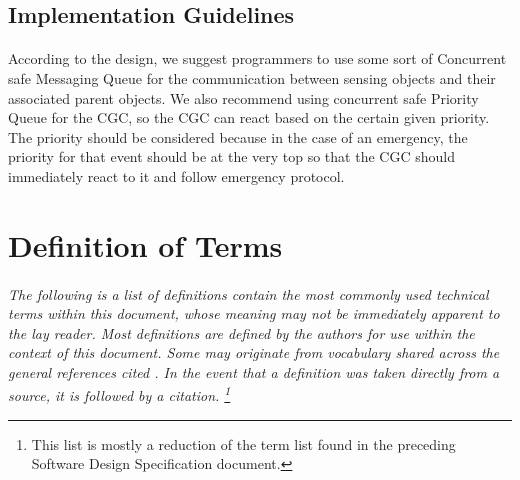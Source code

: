 \documentclass[12pt]{article}
\begin{document}
    \subsection{Implementation Guidelines}
    \paragraph{} According to the design, we suggest programmers to use some sort of 
    Concurrent safe Messaging Queue for the communication between sensing objects and 
    their associated parent objects. We also recommend using concurrent safe Priority 
    Queue for the CGC, so the CGC can react based on the certain given priority. The 
    priority should be considered because in the case of an emergency, the priority 
    for that event should be at the very top so that the CGC should immediately react 
    to it and follow emergency protocol.

\section{Definition of Terms} \label{defs}
\paragraph{} \textit{The following is a list of definitions contain the most commonly used 
technical terms within this document, whose meaning may not be immediately apparent to the 
lay reader. Most definitions are defined by the authors for use within the context of this 
document. Some may originate from vocabulary shared across the general references cited \nocite{*}. 
In the event that a definition was taken directly from a source, it is followed by a citation.
\footnote{This list is mostly a reduction of the term list found in the preceding Software 
Design Specification document.}}
\end{document}

